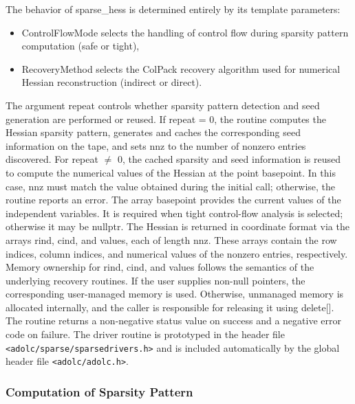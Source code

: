 \documentclass[11pt,twoside]{article}
\begin{document}
%
The behavior of {\sf sparse\_hess} is determined entirely by its template
parameters:
\begin{itemize}
  \item {\sf ControlFlowMode} selects the handling of control flow during
        sparsity pattern computation (safe or tight),
  \item {\sf RecoveryMethod} selects the ColPack recovery algorithm used
        for numerical Hessian reconstruction (indirect or direct).
\end{itemize}
%
The argument {\sf repeat} controls whether sparsity pattern detection
and seed generation are performed or reused.  If {\sf repeat = 0}, the
routine computes the Hessian sparsity pattern, generates and caches the
corresponding seed information on the tape, and sets {\sf nnz} to the
number of nonzero entries discovered.
%
For {\sf repeat $\neq$ 0}, the cached sparsity and seed information is
reused to compute the numerical values of the Hessian at the point
{\sf basepoint}.  In this case, {\sf nnz} must match the value obtained
during the initial call; otherwise, the routine reports an error.
%
The array {\sf basepoint} provides the current values of the independent
variables. It is required when tight control-flow analysis is selected;
otherwise it may be {\sf nullptr}.
%
The Hessian is returned in coordinate format via the arrays {\sf rind},
{\sf cind}, and {\sf values}, each of length {\sf nnz}.  These arrays
contain the row indices, column indices, and numerical values of the
nonzero entries, respectively.
%
Memory ownership for {\sf rind}, {\sf cind}, and {\sf values} follows the
semantics of the underlying recovery routines.  If the user supplies
non-null pointers, the corresponding user-managed memory is used.
Otherwise, unmanaged memory is allocated internally, and the caller is
responsible for releasing it using {\sf delete[]}.
%
The routine returns a non-negative status value on success and a
negative error code on failure.
%
The driver routine is prototyped in the header file
\verb=<adolc/sparse/sparsedrivers.h>= and is included automatically by
the global header file \verb=<adolc/adolc.h>=.

\subsubsection{Computation of Sparsity Pattern}
\end{document}
